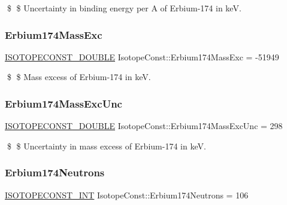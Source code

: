 \$ \$ Uncertainty in binding energy per A of Erbium-\/174 in keV. \mbox{\label{group___isotope_const-_erbium-_er174_ga51a92a946f841ae5d9ff005a63ca6264}} 
\subsubsection{\texorpdfstring{Erbium174\+Mass\+Exc}{Erbium174MassExc}}
{\footnotesize\ttfamily \mbox{\hyperlink{group___isotope_const-_macros_ga8f45a7272ce02c0b4c65c44636ed719a}{I\+S\+O\+T\+O\+P\+E\+C\+O\+N\+S\+T\+\_\+\+D\+O\+U\+B\+LE}} Isotope\+Const\+::\+Erbium174\+Mass\+Exc = -\/51949}

\$ \$ Mass excess of Erbium-\/174 in keV. \mbox{\label{group___isotope_const-_erbium-_er174_ga6b2961c9b856f0b32a072f053c775edc}} 
\subsubsection{\texorpdfstring{Erbium174\+Mass\+Exc\+Unc}{Erbium174MassExcUnc}}
{\footnotesize\ttfamily \mbox{\hyperlink{group___isotope_const-_macros_ga8f45a7272ce02c0b4c65c44636ed719a}{I\+S\+O\+T\+O\+P\+E\+C\+O\+N\+S\+T\+\_\+\+D\+O\+U\+B\+LE}} Isotope\+Const\+::\+Erbium174\+Mass\+Exc\+Unc = 298}

\$ \$ Uncertainty in mass excess of Erbium-\/174 in keV. \mbox{\label{group___isotope_const-_erbium-_er174_gaf675a94d701531bbacbd2b388272f23e}} 
\subsubsection{\texorpdfstring{Erbium174\+Neutrons}{Erbium174Neutrons}}
{\footnotesize\ttfamily \mbox{\hyperlink{group___isotope_const-_macros_ga5f18360b3e99483a35c32d789e62621c}{I\+S\+O\+T\+O\+P\+E\+C\+O\+N\+S\+T\+\_\+\+I\+NT}} Isotope\+Const\+::\+Erbium174\+Neutrons = 106}

